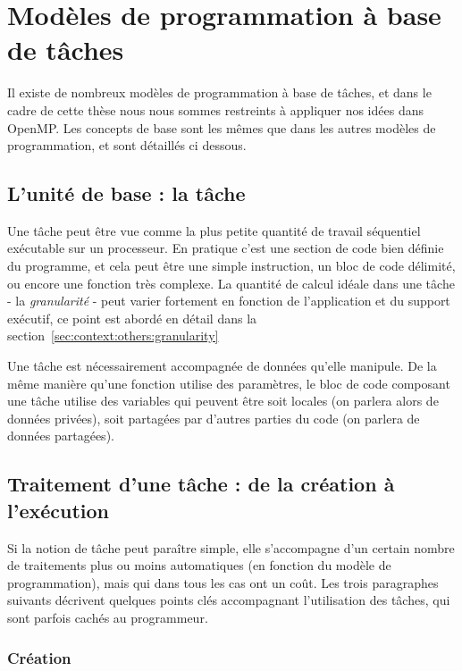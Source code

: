 \section{Modèles de programmation à base de tâches}\label{sec:context:others}

Il existe de nombreux modèles de programmation à base de tâches, et dans le cadre de cette thèse nous nous sommes restreints à appliquer nos idées dans OpenMP.
Les concepts de base sont les mêmes que dans les autres modèles de programmation, et sont détaillés ci dessous.

\subsection{L'unité de base : la tâche}

Une tâche peut être vue comme la plus petite quantité de travail séquentiel exécutable sur un processeur.
En pratique c'est une section de code bien définie du programme, et cela peut être une simple instruction, un bloc de code délimité, ou encore une fonction très complexe.
La quantité de calcul idéale dans une tâche - la \emph{granularité} - peut varier fortement en fonction de l'application et du support exécutif, ce point est abordé en détail dans la section~\ref{sec:context:others:granularity}

Une tâche est nécessairement accompagnée de données qu'elle manipule. De la même manière qu'une fonction utilise des paramètres, le bloc de code composant une tâche utilise des variables qui peuvent être soit locales (on parlera alors de données privées), soit partagées par d'autres parties du code (on parlera de données partagées).


\subsection{Traitement d'une tâche : de la création à l'exécution}\label{sec:context:others:costs}

Si la notion de tâche peut paraître simple, elle s'accompagne d'un certain nombre de traitements plus ou moins automatiques (en fonction du modèle de programmation), mais qui dans tous les cas ont un coût.
Les trois paragraphes suivants décrivent quelques points clés accompagnant l'utilisation des tâches, qui sont parfois cachés au programmeur.

\subsubsection{Création}


